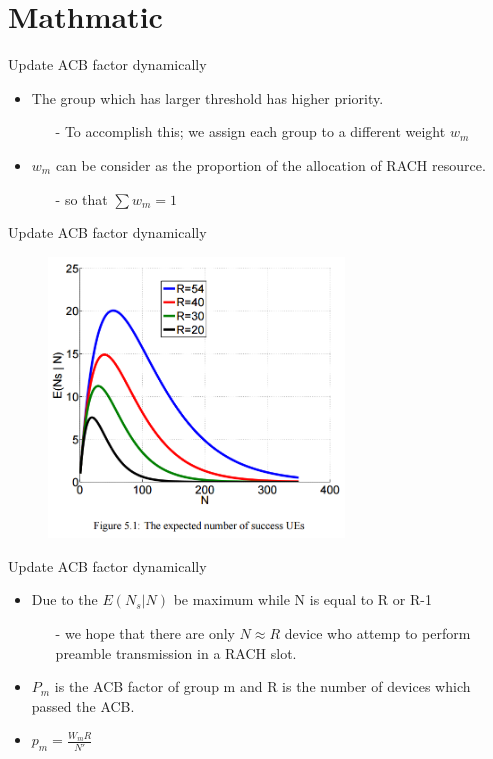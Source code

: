 \documentclass{beamer}
\begin{document}
\section{Mathmatic}
\begin{frame}{Update ACB factor dynamically}
    \begin{itemize}
        \item The group which has larger threshold has higher priority.
        \begin{itemize}
            \item[-] To accomplish this; we assign each group to a different weight $w_{{m}}$
        \end{itemize}
        \item $w_{{m}}$ can be consider as the proportion of the allocation of RACH resource.
        \begin{itemize}
            \item[-] so that $\sum w_{{m}}=1$
        \end{itemize}
    \end{itemize}
\end{frame}
\begin{frame}{Update ACB factor dynamically}
    \begin{figure}[t]
        \centering
        \includegraphics[width=0.7\textwidth]{figures/5_1.png}
    \end{figure}
\end{frame}
\begin{frame}{Update ACB factor dynamically}
    \begin{itemize}
        \item Due to the $E(N_s|N)$ be maximum while N is equal to R or R-1
        \begin{itemize}
            \item[-] we hope that there are only $N \approx R$ device who attemp to perform preamble transmission in a RACH slot. 
        \end{itemize}
        \item $P_m$ is the ACB factor of group m and R is the number of devices which passed the ACB.
        \item $p_m = \frac {W_mR}{N'}$
    \end{itemize}
\end{frame}
\end{document}
